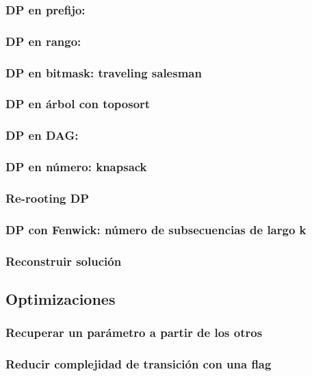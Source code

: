     \subsubsection{DP en prefijo: }
    \subsubsection{DP en rango: }
    \subsubsection{DP en bitmask: traveling salesman}
    \subsubsection{DP en árbol con toposort}
    \subsubsection{DP en DAG: }
    \subsubsection{DP en número: knapsack}
    \subsubsection{Re-rooting DP}
    \subsubsection{DP con Fenwick: número de subsecuencias de largo k}
    \subsubsection{Reconstruir solución}
\subsection{Optimizaciones}
    \subsubsection{Recuperar un parámetro a partir de los otros}
    \subsubsection{Reducir complejidad de transición con una flag}
